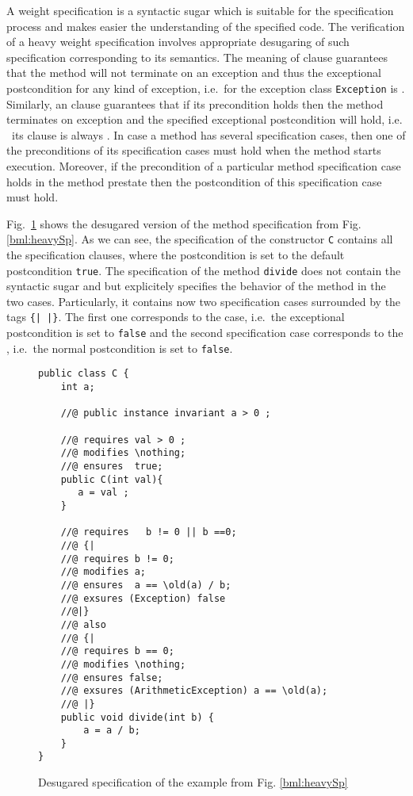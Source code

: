 A \heavy{} weight specification is a  syntactic sugar which is suitable for the specification process and  makes easier the understanding
 of the specified code. The verification of  a heavy weight specification involves appropriate desugaring of such specification corresponding to its 
semantics.  
The meaning of   clause guarantees that the method will not terminate on an exception and thus the exceptional postcondition 
for any kind of exception, i.e.\ for the exception class  \texttt{Exception} is  . Similarly, an
  clause guarantees that if its precondition holds then the method terminates on exception and the specified 
exceptional postcondition will hold, i.e. \ its \ensures{} clause is always    . 
In case a method has several specification cases, then one of the  preconditions of its specification cases must hold when the method starts execution. 
Moreover, if the precondition of a particular method specification case holds in the method prestate then the postcondition of this specification case must hold.

Fig.\ \ref{bml:Desugar}  shows  the desugared version of the method specification from  Fig. \ref{bml:heavySp}. As we can see, the specification of the constructor 
\lstinline!C! contains all the specification clauses, where the postcondition is set to the default postcondition \lstinline!true!.
The specification of the method \lstinline!divide! does not contain the syntactic sugar  and
  but explicitely specifies the behavior of the method in the two cases. Particularly, it contains now 
two specification cases surrounded by the tags  \lstinline!{| |}!. The first one corresponds to the 
 case, i.e.\ the exceptional postcondition is set to \lstinline!false! and  the second specification case corresponds to the 
, i.e.\ the normal postcondition is set to  \lstinline!false!.

\begin{figure}
\begin{lstlisting}[frame=trbl]
public class C {
    int a;
    
    //@ public instance invariant a > 0 ;
    
    //@ requires val > 0 ;
    //@ modifies \nothing;
    //@ ensures  true;
    public C(int val){
       a = val ;
    }
   
    //@ requires   b != 0 || b ==0;
    //@ {|
    //@ requires b != 0;
    //@ modifies a;
    //@ ensures  a == \old(a) / b;  
    //@ exsures (Exception) false
    //@|}
    //@ also 
    //@ {|
    //@ requires b == 0;
    //@ modifies \nothing;
    //@ ensures false;
    //@ exsures (ArithmeticException) a == \old(a);
    //@ |}
    public void divide(int b) {
        a = a / b;
    }
}
\end{lstlisting}
\caption{\sc Desugared specification of the example from Fig. \ref{bml:heavySp} } \label{bml:Desugar}
\end{figure}




